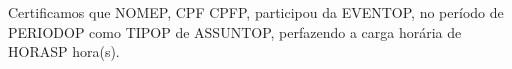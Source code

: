 Certificamos que NOMEP, CPF CPFP, participou da EVENTOP, no período de PERIODOP como TIPOP de ASSUNTOP, perfazendo a carga horária de HORASP hora(s).
